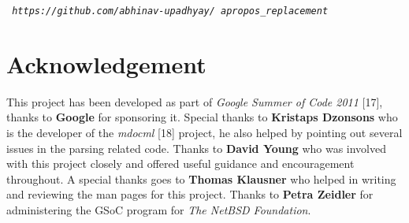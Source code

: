 \documentclass[letterpaper,twocolumn,10pt]{article}
\begin{document}
{\tt
 \emph{https://github.com/abhinav-upadhyay/
 apropos\_replacement}
}

\pagebreak
\section{Acknowledgement}
This project has been developed as part of \emph{Google Summer of Code 2011}
[17], thanks to \textbf{Google} for sponsoring it. Special thanks to
\textbf{Kristaps Dzonsons} who is the developer of the \textit{mdocml} [18]
project, he also helped by pointing out several issues in the parsing related
code. Thanks to \textbf{David Young} who was involved with
this project closely and offered useful guidance and encouragement throughout. A
special thanks goes to \textbf{Thomas Klausner} who helped in writing and
reviewing the man pages for this project. Thanks to \textbf{Petra Zeidler} for
administering the GSoC program for \textit{The NetBSD Foundation}. \\
\end{document}
